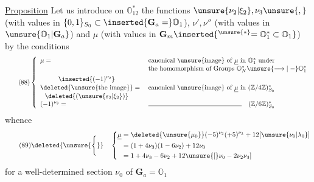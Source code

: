 \uline{Proposition} Let us introduce on  $\mathbb O_{12}^*$ the functions \inserted{$\underline{\mu}\mapsto$} $\unsure{\nu_2|\xi_2},\nu_3\unsure{,}$  (with values in $\{0,1\}_{S_0}\subset\inserted{\mathbf G_a=}\mathbb O_1$), $\nu',\nu''$  (with values in $\unsure{\mathbb O_1|\mathbf G_a}$) and $\mu$ (with values in $\mathbf G_m\inserted{^{\unsure{*}}=\mathbb O_1^*\subset\mathbb O_1}$)  by the conditions
\[
\tag{88}
\left\{\begin{array}{ll}
\mu={}&\text{canonical \unsure{image} of }\underline{\mu}\text{ in }\mathbb O_1^*\text{ under}\\
&\text{the homomorphism of Groups }\mathbb O_N^*\unsure{\longrightarrow|\mathrel{-}}\mathbb O_1^*\\[4pt]
\begin{gathered}
\inserted{(-1)^{\nu_2}}\\[-2pt]
\deleted{\text{\unsure{the image}}}\\[-2pt]
\deleted{(\unsure{\varepsilon_2|\xi_2})}
\end{gathered}={}&\text{canonical \unsure{image} of }\underline{\mu}\text{ in }(\mathbb Z/4\mathbb Z)^*_{S_0}\\[4pt]
(-1)^{\nu_3}={}&\rule{5cm}{0.4pt}\quad(\mathbb Z/6\mathbb Z)^*_{S_0}
\end{array}\right.
\]
whence
\[
\tag{89}
\deleted{\unsure{\Bigg\{}}\quad
\left\{\begin{aligned}
\underline{\mu}&=\deleted{\unsure{\mu_0}}(-5)^{\nu_2}(+5)^{\nu_3}+12[\unsure{\nu_0|\lambda_0}]\\
&=(1+4\nu_3)(1-6\nu_2)+12\nu_0\\
&=1+4\nu_3-6\nu_2+12\unsure{[}\nu_0-2\nu_2\nu_3]
\end{aligned}\right.
\]
for a well-determined section $\nu_0$ of $\mathbf G_a=\mathbb O_1$

